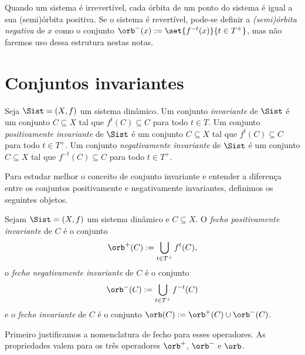 Quando um sistema é irrevertível, cada órbita de um ponto do sistema é igual a sua (semi)órbita positiva. Se o sistema é revertível, pode-se definir a \emph{(semi)órbita negativa} de $x$ como o conjunto $\orb^-(x) := \set{f^{-t}(x)}{t \in T^+}$, mas não faremos uso dessa estrutura nestas notas.

\section{Conjuntos invariantes}

\begin{definition}
Seja $\Sist=(X,f)$ um sistema dinâmico. Um conjunto \emph{invariante} de $\Sist$ é um conjunto $C \subseteq X$ tal que $f^t(C) \subseteq C$ para todo $t \in T$. Um conjunto \emph{positivamente invariante} de $\Sist$ é um conjunto $C \subseteq X$ tal que $f^t(C) \subseteq C$ para todo $t \in T^+$. Um conjunto \emph{negativamente invariante} de $\Sist$ é um conjunto $C \subseteq X$ tal que $f^{-t}(C) \subseteq C$ para todo $t \in T^+$.
\end{definition}

Para estudar melhor o conceito de conjunto invariante e entender a diferença entre os conjuntos positivamente e negativamente invariantes, definimos os seguintes objetos.

\begin{definition}
Sejam $\Sist=(X,f)$ um sistema dinâmico e $C \subseteq X$. O \emph{fecho positivamente invariante} de $C$ é o conjunto
	\begin{equation*}
	\orb^+(C) := \bigcup_{t \in T^+} f^t(C),
	\end{equation*}
o \emph{fecho negativamente invariante} de $C$ é o conjunto
	\begin{equation*}
	\orb^-(C) := \bigcup_{t \in T^+} f^{-t}(C)
	\end{equation*}
e o \emph{fecho invariante} de $C$ é o conjunto $\orb(C) := \orb^+(C) \cup \orb^-(C)$.
\end{definition}

Primeiro justificamos a nomenclatura de fecho para esses operadores. As propriedades valem para os três operadores $\orb^+$, $\orb^-$ e $\orb$.


